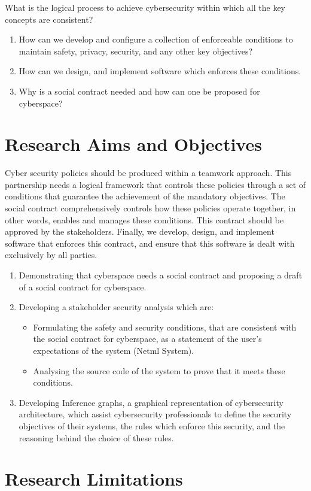 What is the logical process to achieve cybersecurity within which all the key concepts are consistent?
\begin{enumerate}
\item How can we develop and configure a collection of enforceable conditions to maintain safety, privacy, security, and any other key objectives?
\item How can we design, and implement software which enforces these conditions.  %
\item Why is a social contract needed and how can one be proposed for cyberspace?
\end{enumerate}



\section{Research Aims and Objectives}
Cyber security policies should be produced within a teamwork approach.  This partnership needs a logical framework that controls these policies through a set of conditions that guarantee the achievement of the mandatory objectives.  The social contract comprehensively controls how these policies operate together, in other words, enables and manages these conditions.  This contract should be approved by the stakeholders. Finally, we develop, design, and implement software that enforces this contract, and ensure that this software is dealt with exclusively by all parties.
\begin{enumerate}
\item Demonstrating that cyberspace needs a social contract and proposing a draft of a social contract for cyberspace.
\item Developing a stakeholder security analysis which are: 
\begin{itemize}
\item Formulating the safety and security conditions, that are consistent with the social contract for cyberspace, as a statement of the user’s expectations of the system (Netml System).
\item Analysing the source code of the system to prove that it meets these conditions.
\end{itemize}
\item Developing Inference graphs, a graphical representation of cybersecurity architecture, which assist cybersecurity professionals to define the security objectives of their systems, the rules which enforce this security, and the reasoning behind the choice of these rules.
\end{enumerate}
\section{Research Limitations}
